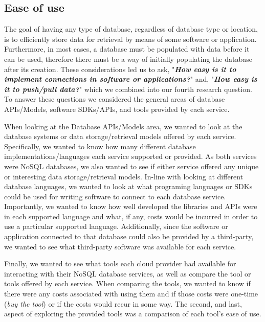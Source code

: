 
\subsection{Ease of use}

The goal of having any type of database, regardless of database type or location, is to efficiently store data for retrieval by means of some software or application.  Furthermore, in most cases, a database must be populated with data before it can be used, therefore there must be a way of initially populating the database after its creation. These considerations led us to ask, "\emph{\textbf{How easy is it to implement connections in software or applications?}}" and, "\emph{\textbf{How easy is it to push/pull data?}}" which we combined into our fourth research question.  To answer these questions we considered the general areas of database APIs/Models, software SDKs/APIs, and tools provided by each service.

When looking at the Database APIs/Models area, we wanted to look at the database systems or data storage/retrieval models offered by each service.  Specifically, we wanted to know how many different database implementations/languages each service supported or provided.  As both services were NoSQL databases, we also wanted to see if either service offered any unique or interesting data storage/retrieval models.  In-line with looking at different database languages, we wanted to look at what programing languages or SDKs could be used for writing software to connect to each database service.  Importantly, we wanted to know how well developed the  libraries and APIs were in each supported language and what, if any, costs would be incurred in order to use a particular supported language.  Additionally, since the software or application connected to that database could also be provided by a third-party, we wanted to see what third-party software was available for each service.  

Finally, we wanted to see what tools each cloud provider had available for interacting with their NoSQL database services, as well as compare the tool or tools offered by each service.  When comparing the tools, we wanted to know if there were any costs associated with using them and if those costs were one-time (\emph{buy the tool}) or if the costs would recur in some way.  The second, and last, aspect of exploring the provided tools was a comparison of each tool's ease of use.


